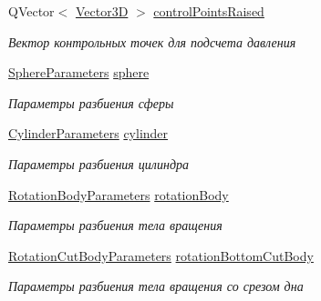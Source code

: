 \begin{DoxyCompactItemize}
Q\+Vector$<$ \mbox{\hyperlink{class_vector3_d}{Vector3D}} $>$ \mbox{\hyperlink{class_body_fragmentation_a04437ab42965f8060a6d769bd696cd13}{control\+Points\+Raised}}
\begin{DoxyCompactList}\small\item\em Вектор контрольных точек для подсчета давления \end{DoxyCompactList}\item 
\mbox{\label{class_body_fragmentation_a9787c79555a594baa9771d53c5ae4ba8}} 
\mbox{\hyperlink{struct_sphere_parameters}{Sphere\+Parameters}} \mbox{\hyperlink{class_body_fragmentation_a9787c79555a594baa9771d53c5ae4ba8}{sphere}}
\begin{DoxyCompactList}\small\item\em Параметры разбиения сферы \end{DoxyCompactList}\item 
\mbox{\label{class_body_fragmentation_a80d6b33b7f2f6f59de7da2dfa1f9dee8}} 
\mbox{\hyperlink{struct_cylinder_parameters}{Cylinder\+Parameters}} \mbox{\hyperlink{class_body_fragmentation_a80d6b33b7f2f6f59de7da2dfa1f9dee8}{cylinder}}
\begin{DoxyCompactList}\small\item\em Параметры разбиения цилиндра \end{DoxyCompactList}\item 
\mbox{\label{class_body_fragmentation_acbf8d8875cbf77bacbfba7d57efbfaf3}} 
\mbox{\hyperlink{struct_rotation_body_parameters}{Rotation\+Body\+Parameters}} \mbox{\hyperlink{class_body_fragmentation_acbf8d8875cbf77bacbfba7d57efbfaf3}{rotation\+Body}}
\begin{DoxyCompactList}\small\item\em Параметры разбиения тела вращения \end{DoxyCompactList}\item 
\mbox{\label{class_body_fragmentation_a873cb95874242a604f1b5bbc30e171be}} 
\mbox{\hyperlink{struct_rotation_cut_body_parameters}{Rotation\+Cut\+Body\+Parameters}} \mbox{\hyperlink{class_body_fragmentation_a873cb95874242a604f1b5bbc30e171be}{rotation\+Bottom\+Cut\+Body}}
\begin{DoxyCompactList}\small\item\em Параметры разбиения тела вращения со срезом дна \end{DoxyCompactList}\end{DoxyCompactItemize}


